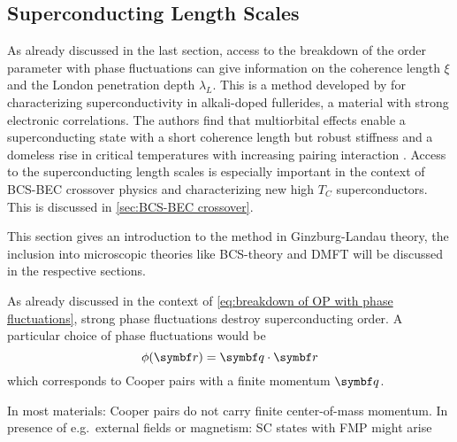 \documentclass[../notes.tex]{subfiles}
\begin{document}
\subsection*{Superconducting Length Scales}

As already discussed in the last section, access to the breakdown of the order parameter with phase fluctuations can give information on the coherence length \(\xi\) and the London penetration depth \(\lambda_L\).
This is a method developed by \citeauthor{wittBypassingLatticeBCS2024} for characterizing superconductivity in alkali-doped fullerides, a material with strong electronic correlations.
The authors find that multiorbital effects enable a superconducting state with a short coherence length but robust stiffness and a domeless rise in critical temperatures with increasing pairing interaction \cite{wittBypassingLatticeBCS2024}.
Access to the superconducting length scales is especially important in the context of BCS-BEC crossover physics and characterizing new high \(T_C\) superconductors.
This is discussed in \cref{sec:BCS-BEC crossover}.

This section gives an introduction to the method in Ginzburg-Landau theory, the inclusion into microscopic theories like BCS-theory and DMFT will be discussed in the respective sections.

As already discussed in the context of \cref{eq:breakdown of OP with phase fluctuations}, strong phase fluctuations destroy superconducting order.
A particular choice of phase fluctuations would be
\begin{equation}
	\phi (\vb{r}) = \vb{q} \cdot \vb{r}
\end{equation}
which corresponds to Cooper pairs with a finite momentum \(\vb{q}\).

In most materials: Cooper pairs do not carry finite center-of-mass momentum.
In presence of e.g.\ external fields or magnetism: SC states with FMP might arise \cite{chenFiniteMomentumCooper2018, wanOrbitalFuldeFerrell2023, yuanSupercurrentDiodeEffect2022}
\end{document}
